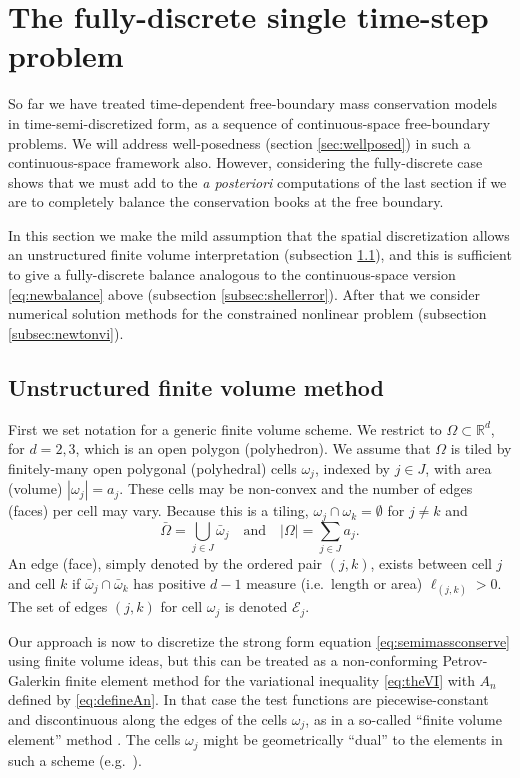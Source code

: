 \documentclass[final,leqno,onefignum,onetabnum]{siamltex1213bueler}
\newcommand\RR{\mathbb{R}}
\begin{document}
\section{The fully-discrete single time-step problem}  \label{sec:spacediscretized}

So far we have treated time-dependent free-boundary mass conservation models in time-semi-discretized form, as a sequence of continuous-space free-boundary problems.  We will address well-posedness (section \ref{sec:wellposed}) in such a continuous-space framework also.  However, considering the fully-discrete case shows that we must add to the \emph{a posteriori} computations of the last section if we are to completely balance the conservation books at the free boundary.

In this section we make the mild assumption that the spatial discretization allows an unstructured finite volume \cite{LeVeque2002} interpretation (subsection \ref{subsec:spacenotation}), and this is sufficient to give a fully-discrete balance analogous to the continuous-space version \eqref{eq:newbalance} above (subsection \ref{subsec:shellerror}).  After that we consider numerical solution methods for the constrained nonlinear problem (subsection \ref{subsec:newtonvi}).

\subsection{Unstructured finite volume method} \label{subsec:spacenotation}  First we set notation for a generic finite volume scheme.  We restrict to $\Omega \subset \RR^d$, for $d=2,3$, which is an open polygon (polyhedron).  We assume that $\Omega$ is tiled by finitely-many open polygonal (polyhedral) cells $\omega_j$, indexed by $j\in J$, with area (volume) $|\omega_j|=a_j$.  These cells may be non-convex and the number of edges (faces) per cell may vary.  Because this is a tiling, $\omega_j \cap \omega_k = \emptyset$ for $j\ne k$ and
\begin{equation}
\bar\Omega = \bigcup_{j\in J} \bar \omega_j \quad \text{and} \quad |\Omega| = \sum_{j\in J} a_j.  \label{eq:tiling}
\end{equation}
An edge (face), simply denoted by the ordered pair $(j,k)$, exists between cell $j$ and cell $k$ if $\bar\omega_j \cap \bar \omega_k$ has positive $d-1$ measure (i.e.~length or area) $\ell_{(j,k)}>0$.  The set of edges $(j,k)$ for cell $\omega_j$ is denoted $\mathcal{E}_j$.

Our approach is now to discretize the strong form equation \eqref{eq:semimassconserve} using finite volume ideas, but this can be treated as a non-conforming Petrov-Galerkin finite element method for the variational inequality \eqref{eq:theVI} with $A_n$ defined by \eqref{eq:defineAn}.  In that case the test functions are piecewise-constant and discontinuous along the edges of the cells $\omega_j$, as in a so-called ``finite volume element'' method \cite{Bueler2015,Cai1990,EwingLinLin2002}.  The cells $\omega_j$ might be geometrically ``dual'' to the elements in such a scheme (e.g.~\cite{Ringleretal2013}).
\end{document}
